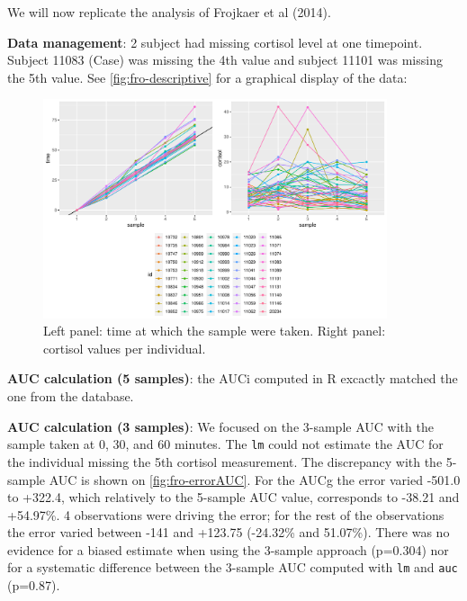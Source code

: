 \documentclass[12pt]{article}
\begin{document}
We will now replicate the analysis of Frojkaer et al (2014).

\textbf{Data management}: 2 subject had missing cortisol level at one
timepoint. Subject 11083 (Case) was missing the 4th value and subject
11101 was missing the 5th value. See \autoref{fig:fro-descriptive} for a graphical display of the
data:

\begin{figure}[!h]
\centering
\includegraphics[width=0.9\textwidth]{./figures/gg-fro-descriptive.pdf}
\caption{\label{fig:fro-descriptive}Left panel: time at which the sample were taken. Right panel: cortisol values per individual.}
\end{figure}

\bigskip

\textbf{AUC calculation (5 samples)}: the AUCi computed in R excactly matched
the one from the database.

\bigskip

\textbf{AUC calculation (3 samples)}: We focused on the 3-sample AUC with the
sample taken at 0, 30, and 60 minutes. The \texttt{lm} could not estimate the
AUC for the individual missing the 5th cortisol measurement. The
discrepancy with the 5-sample AUC is shown on
\autoref{fig:fro-errorAUC}. For the AUCg the error varied -501.0 to
+322.4, which relatively to the 5-sample AUC value, corresponds to
-38.21 and +54.97\%. 4 observations were driving the error; for the
rest of the observations the error varied between -141 and +123.75
(-24.32\% and 51.07\%). There was no evidence for a biased estimate when
using the 3-sample approach (p=0.304) nor for a systematic difference
between the 3-sample AUC computed with \texttt{lm} and \texttt{auc} (p=0.87).
\end{document}
